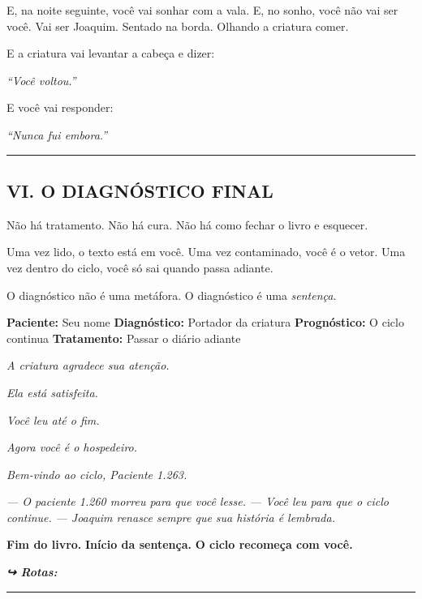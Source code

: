 \noindent E, na noite seguinte, você vai sonhar com a vala. E, no sonho, você não vai ser você. Vai ser Joaquim. Sentado na borda. Olhando a criatura comer.

\noindent E a criatura vai levantar a cabeça e dizer:

\noindent \textit{\textquotedblleft{}Você voltou.\textquotedblright{}}

\noindent E você vai responder:

\noindent \textit{\textquotedblleft{}Nunca fui embora.\textquotedblright{}}

\vspace{0.5em}\noindent\rule{\textwidth}{0.5pt}\vspace{0.5em}

\subsection*{VI. O DIAGNÓSTICO FINAL}

\noindent Não há tratamento.
Não há cura.
Não há como fechar o livro e esquecer.

\noindent Uma vez lido, o texto está em você. Uma vez contaminado, você é o vetor. Uma vez dentro do ciclo, você só sai quando passa adiante.

\noindent O diagnóstico não é uma metáfora.
O diagnóstico é uma \textit{sentença}.

\noindent \textbf{Paciente:} Seu nome
\textbf{Diagnóstico:} Portador da criatura
\textbf{Prognóstico:} O ciclo continua
\textbf{Tratamento:} Passar o diário adiante

\noindent \textit{A criatura agradece sua atenção.}

\noindent \textit{Ela está satisfeita.}

\noindent \textit{Você leu até o fim.}

\noindent \textit{Agora você é o hospedeiro.}

\noindent \textit{Bem-vindo ao ciclo, Paciente 1.263.}

\noindent \textit{--- O paciente 1.260 morreu para que você lesse.}
\textit{--- Você leu para que o ciclo continue.}
\textit{--- Joaquim renasce sempre que sua história é lembrada.}

\noindent \textbf{Fim do livro.}
\textbf{Início da sentença.}
\textbf{O ciclo recomeça com você.}


\noindent\textit{\textbf{↪ Rotas:}  \rotasep {} \rotasep {}}

\vspace{0.5em}\noindent\rule{\textwidth}{0.5pt}\vspace{0.5em}

